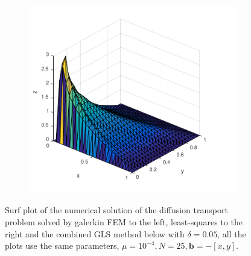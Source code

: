\begin{figure}[h!]
\begin{subfigure}[b]{0.48\textwidth}
  \end{subfigure}
  \begin{subfigure}[b]{0.48\textwidth}
	\includegraphics[width=\textwidth]{Figures/GLSFEM_difftrans_aNeg.pdf}
  \end{subfigure}
  \vspace{-0.1\baselineskip}
	\caption{Surf plot of the numerical solution of the diffusion transport problem solved by galerkin FEM to the left, least-squares to the right and the combined GLS method below with $\delta = 0.05$, all the plots use the same parameters, $\mu = 10^{-4},N=25,\mathbf{b} = -[x,y]$.}
  \label{fig:SurfDiffTransPositiveFEM}
\end{figure}
%
